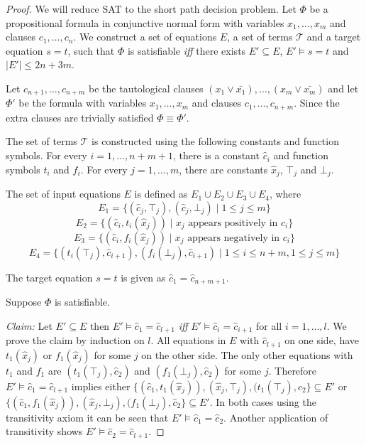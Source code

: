 \begin{proof}

We will reduce SAT to the short path decision problem.
Let $\Phi$ be a propositional formula in conjunctive normal form with variables $x_1,\ldots,x_m$ and clauses $c_1,\ldots,c_n$.
We construct a set of equations $E$, a set of terms $\mathcal{T}$ and a target equation $s = t$, 
such that $\Phi$ is satisfiable \emph{iff} there exists $E' \subseteq E$, $E' \models s = t$ and $|E'| \leq 2n + 3m$.

Let $c_{n+1},\ldots,c_{n+m}$ be the tautological clauses $(x_1 \vee \bar{x_1}),\ldots,(x_m \vee \bar{x_m})$ and let $\Phi'$ be the formula with variables $x_1, \ldots,x_m$ and clauses $c_1,\ldots,c_{n+m}$.
Since the extra clauses are trivially satisfied $\Phi \equiv \Phi'$.

The set of terms $\mathcal{T}$ is constructed using the following constants and function symbols.
For every $i= 1,\ldots,n + m + 1$, there is a constant $\hat{c}_i$ and function symbols $t_i$ and $f_i$.
For every $j= 1,\ldots,m$, there are constants $\hat{x}_j$, $\top_j$ and $\bot_j$.

The set of input equations $E$ is defined as $E_1 \cup E_2 \cup E_3 \cup E_4$, where
$$E_1 = \{ (\hat{c}_j,\top_j), (\hat{c}_j,\bot_j) \mid 1 \leq j \leq m\}$$
$$E_2 = \{ (\hat{c}_i, t_i(\hat{x}_j)) \mid x_j \text{ appears positively in } c_i\}$$
$$E_3 = \{ (\hat{c}_i, f_i(\hat{x}_j)) \mid x_j \text{ appears negatively in } c_i\}$$
$$E_4 = \{ (t_i(\top_j),\hat{c}_{i+1}),(f_i(\bot_j), \hat{c}_{i+1}) \mid 1 \leq i \leq n+m, 1 \leq j \leq m\}$$

The target equation $s = t$ is given as $\hat{c}_1 = \hat{c}_{n+m+1}$.

Suppose $\Phi$ is satisfiable.

\emph{Claim:} Let $E' \subseteq E$ then $E' \models \hat{c}_1 = \hat{c}_{l+1}$ \emph{iff} $E' \models \hat{c}_i = \hat{c}_{i+1}$ for all $i = 1,\ldots,l$.
We prove the claim by induction on $l$.
All equations in $E$ with $\hat{c}_{l+1}$ on one side, have $t_1(\hat{x}_j)$ or $f_1(\hat{x}_j)$ for some $j$ on the other side.
The only other equations with $t_1$ and $f_1$ are $(t_1(\top_j), \hat{c}_2)$ and $(f_1(\bot_j), \hat{c}_2)$ for some $j$.
Therefore $E' \models \hat{c}_1 = \hat{c}_{l+1}$ implies either $\{(\hat{c}_1, t_1(\hat{x}_j)), (\hat{x}_j,\top_j), (t_1(\top_j),\hat{c}_2\} \subseteq E'$ or $\{(\hat{c}_1, f_1(\hat{x}_j)), (\hat{x}_j,\bot_j), (f_1(\bot_j),\hat{c}_2\} \subseteq E'$. 
In both cases using the transitivity axiom it can be seen that $E' \models \hat{c}_1 = \hat{c}_{2}$.
Another application of transitivity shows $E' \models \hat{c}_2 = \hat{c}_{l+1}$.


\end{proof}
